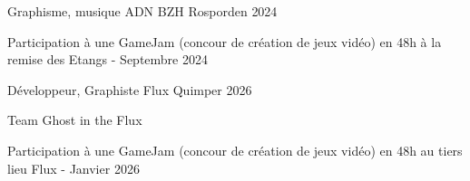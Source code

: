 

\begin{cventries}

  \cventry
    {Graphisme, musique} %
    {ADN BZH} %
    {Rosporden} %
    {2024} %
    {
      \begin{cvitems} %
        \item {Participation à une GameJam (concour de création de jeux vidéo) en 48h à la remise des Etangs - Septembre 2024}
      \end{cvitems}
    }
  \cventry
    {Développeur, Graphiste} %
    {Flux} %
    {Quimper} %
    {2026} %
    {
      \begin{cvitems} %
        \item {Team Ghost in the Flux}
        \item {Participation à une GameJam (concour de création de jeux vidéo) en 48h au tiers lieu Flux - Janvier 2026}
      \end{cvitems}
    }
\end{cventries}
